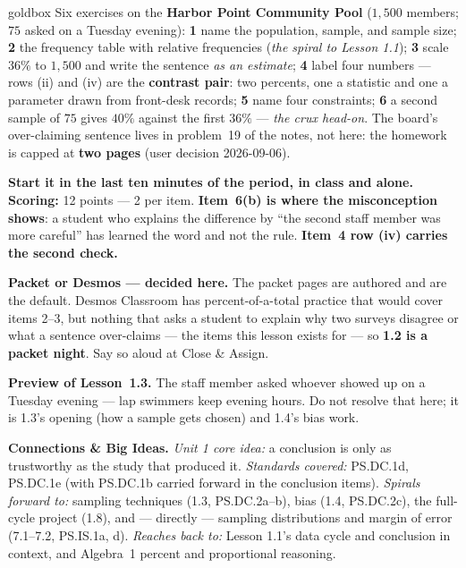 \documentclass[10pt]{article}
\begin{document}
\boxguard
\begin{skillbox}{goldbox}
Six exercises on the \textbf{Harbor Point Community Pool} ($1{,}500$ members; $75$ asked on a
Tuesday evening): \textbf{1} name the population, sample, and sample size; \textbf{2} the
frequency table with relative frequencies (\emph{the spiral to Lesson 1.1}); \textbf{3} scale
$36\%$ to $1{,}500$ and write the sentence \emph{as an estimate}; \textbf{4} label four numbers
--- rows (ii) and (iv) are the \textbf{contrast pair}: two percents, one a statistic and one a
parameter drawn from front-desk records; \textbf{5} name four constraints; \textbf{6} a second
sample of $75$ gives $40\%$ against the first $36\%$ --- \emph{the crux head-on}. The board's
over-claiming sentence lives in problem~19 of the notes, not here: the homework is capped at
\textbf{two pages} (user decision 2026-09-06).

\textbf{Start it in the last ten minutes of the period, in class and alone.} \textbf{Scoring:}
12 points --- 2 per item. \textbf{Item~6(b) is where the misconception shows}: a student who
explains the difference by ``the second staff member was more careful'' has learned the word
and not the rule. \textbf{Item~4 row (iv) carries the second check.}

\textbf{Packet or Desmos --- decided here.} The packet pages are authored and are the default.
Desmos Classroom has percent-of-a-total practice that would cover items 2--3, but nothing that
asks a student to explain why two surveys disagree or what a sentence over-claims --- the items
this lesson exists for --- so \textbf{1.2 is a packet night}. Say so aloud at Close \& Assign.

\textbf{Preview of Lesson~1.3.} The staff member asked whoever showed up on a Tuesday evening
--- lap swimmers keep evening hours. Do not resolve that here; it is 1.3's opening (how a sample
gets chosen) and 1.4's bias work.

\textbf{Connections \& Big Ideas.} \textit{Unit 1 core idea:} a conclusion is only as
trustworthy as the study that produced it. \textit{Standards covered:} PS.DC.1d, PS.DC.1e
(with PS.DC.1b carried forward in the conclusion items). \textit{Spirals forward to:} sampling
techniques (1.3, PS.DC.2a--b), bias (1.4, PS.DC.2c), the full-cycle project (1.8), and ---
directly --- sampling distributions and margin of error (7.1--7.2, PS.IS.1a, d).
\textit{Reaches back to:} Lesson 1.1's data cycle and conclusion in context, and Algebra~1
percent and proportional reasoning.
\end{skillbox}
\end{document}
